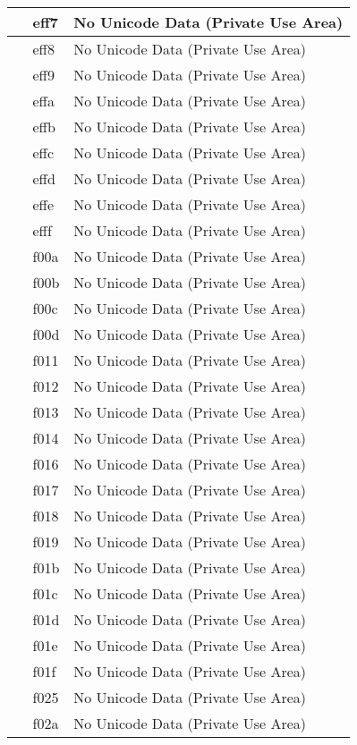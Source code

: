 \documentclass[12pt,letterpaper,openany]{book}
\begin{document}
\begin{center}
\begin{supertabular}{|m{0.25in}|m{0.5in}|m{4in}|}
 & eff7 & No Unicode Data (Private Use Area)\\\hline
 & eff8 & No Unicode Data (Private Use Area)\\\hline
 & eff9 & No Unicode Data (Private Use Area)\\\hline
 & effa & No Unicode Data (Private Use Area)\\\hline
 & effb & No Unicode Data (Private Use Area)\\\hline
 & effc & No Unicode Data (Private Use Area)\\\hline
 & effd & No Unicode Data (Private Use Area)\\\hline
 & effe & No Unicode Data (Private Use Area)\\\hline
 & efff & No Unicode Data (Private Use Area)\\\hline
 & f00a & No Unicode Data (Private Use Area)\\\hline
 & f00b & No Unicode Data (Private Use Area)\\\hline
 & f00c & No Unicode Data (Private Use Area)\\\hline
 & f00d & No Unicode Data (Private Use Area)\\\hline
 & f011 & No Unicode Data (Private Use Area)\\\hline
 & f012 & No Unicode Data (Private Use Area)\\\hline
 & f013 & No Unicode Data (Private Use Area)\\\hline
 & f014 & No Unicode Data (Private Use Area)\\\hline
 & f016 & No Unicode Data (Private Use Area)\\\hline
 & f017 & No Unicode Data (Private Use Area)\\\hline
 & f018 & No Unicode Data (Private Use Area)\\\hline
 & f019 & No Unicode Data (Private Use Area)\\\hline
 & f01b & No Unicode Data (Private Use Area)\\\hline
 & f01c & No Unicode Data (Private Use Area)\\\hline
 & f01d & No Unicode Data (Private Use Area)\\\hline
 & f01e & No Unicode Data (Private Use Area)\\\hline
 & f01f & No Unicode Data (Private Use Area)\\\hline
 & f025 & No Unicode Data (Private Use Area)\\\hline
 & f02a & No Unicode Data (Private Use Area)\\\hline

\end{supertabular}
\end{center}
\end{document}
